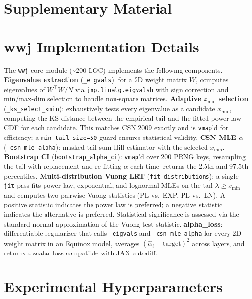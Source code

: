 \documentclass{article} %
\theoremstyle{plain}
\theoremstyle{definition}
\theoremstyle{remark}
\begin{document}



\appendix

\section*{\LARGE Supplementary Material}

\section{wwj Implementation Details}
\label{sec:appendix_impl}

The \texttt{wwj} core module (\textasciitilde200 LOC) implements the following components. \textbf{Eigenvalue extraction} (\texttt{\_eigvals}): for a 2D weight matrix $W$, computes eigenvalues of $W^\top W / N$ via \texttt{jnp.linalg.eigvalsh} with sign correction and min/max-dim selection to handle non-square matrices. \textbf{Adaptive $x_{\min}$ selection} (\texttt{\_ks\_select\_xmin}): exhaustively tests every eigenvalue as a candidate $x_{\min}$, computing the KS distance between the empirical tail and the fitted power-law CDF for each candidate. This matches CSN 2009 exactly and is \texttt{vmap}'d for efficiency; a \texttt{min\_tail\_size=50} guard ensures statistical validity. \textbf{CSN MLE $\alpha$} (\texttt{\_csn\_mle\_alpha}): masked tail-sum Hill estimator with the selected $x_{\min}$. \textbf{Bootstrap CI} (\texttt{bootstrap\_alpha\_ci}): \texttt{vmap}'d over 200 PRNG keys, resampling the tail with replacement and re-fitting $\alpha$ each time; returns the 2.5th and 97.5th percentiles. \textbf{Multi-distribution Vuong LRT} (\texttt{fit\_distributions}): a single \texttt{jit} pass fits power-law, exponential, and lognormal MLEs on the tail $\lambda \geq x_{\min}$ and computes two pairwise Vuong statistics (PL vs.\ EXP, PL vs.\ LN). A positive statistic indicates the power law is preferred; a negative statistic indicates the alternative is preferred. Statistical significance is assessed via the standard normal approximation of the Vuong test statistic. \textbf{alpha\_loss}: differentiable regularizer that calls \texttt{\_eigvals} and \texttt{\_csn\_mle\_alpha} for every 2D weight matrix in an Equinox model, averages $(\hat\alpha_\ell - \text{target})^2$ across layers, and returns a scalar loss compatible with JAX autodiff.

\section{Experimental Hyperparameters}
\label{sec:appendix_hparams}
\end{document}
